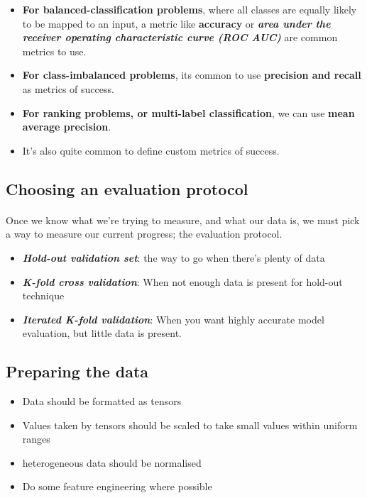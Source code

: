 \documentclass[12pt, a4paper]{article}
\begin{document}
\begin{itemize}
   \item \textbf{For balanced-classification problems}, where all classes are equally likely to be mapped to an input, a metric 
   like \textbf{accuracy} or \textbf{\textit{area under the receiver operating characteristic curve (ROC AUC)}} are common metrics to use.
   \item \textbf{For class-imbalanced problems}, its common to use \textbf{precision and recall} as metrics of success.
   \item \textbf{For ranking problems, or multi-label classification}, we can use \textbf{mean average precision}.
   \item It's also quite common to define custom metrics of success.
\end{itemize}


\subsection{Choosing an evaluation protocol}
\paragraph*{}
Once we know what we're trying to measure, and what our data is, we must pick 
a way to measure our current progress; the evaluation protocol.
\begin{itemize}
   \item \textbf{\textit{Hold-out validation set}}: the way to go when there's plenty of data 
   \item \textbf{\textit{K-fold cross validation}}: When not enough data is present for hold-out technique
   \item \textbf{\textit{Iterated K-fold validation}}: When you want highly accurate model evaluation, but little data is present.
\end{itemize}

\subsection{Preparing the data}
\begin{itemize}
   \item Data should be formatted as tensors 
   \item Values taken by tensors should be scaled to take small values within uniform ranges 
   \item heterogeneous data should be normalised 
   \item Do some feature engineering where possible
\end{itemize}
\end{document}
